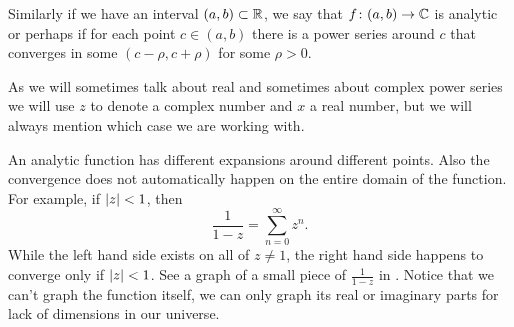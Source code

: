 Similarly if we have an interval $(a,b) \subset {\mathbb{R}}$, we say that $f \colon (a,b)
\to {\mathbb{C}}$ is analytic or perhaps \emph{}
if for each point $c \in
(a,b)$ there is a power series around $c$ that converges in some
$(c-\rho,c+\rho)$
for some $\rho > 0$.

As we will sometimes talk about real and sometimes about complex power
series we will use $z$ to denote a complex number and $x$ a real number, but
we will always mention which case we are working with.

An analytic function has different expansions around different
points.  Also the convergence does not automatically happen on the entire
domain of the function.  For example, if $\lvert {z} \rvert < 1$, then
\begin{equation*}
\frac{1}{1-z} = \sum_{n=0}^\infty z^n .
\end{equation*}
While the left hand side exists on all of $z \not= 1$, the right hand side
happens to converge only if $\lvert {z} \rvert < 1$.  See a graph
of a small piece of $\frac{1}{1-z}$ in .
Notice that we can't graph the
function itself, we can only graph its real or imaginary parts for lack
of dimensions in our universe.

